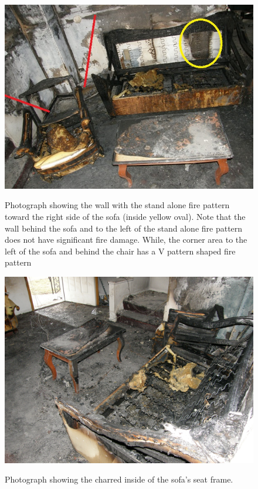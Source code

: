 \documentclass[twoside]{uocthesis}
\begin{document}
{\begin{figure}[h]
	\includegraphics[width=5in]{../Figures/Pre_Flashover_Markup} \\
	\caption[Photograph showing the wall with the stand alone fire pattern toward the right side of the sofa.]{Photograph showing the wall with the stand alone fire pattern toward the right side of the sofa (inside yellow oval). Note that the wall behind the sofa and to the left of the stand alone fire pattern does not have significant fire damage. While, the corner area to the left of the sofa and behind the chair has a V pattern shaped fire pattern}
	\label{Pre_Flashover_Markup}
\end{figure}

\begin{figure}[h]
	\includegraphics[width=5in]{../Figures/Table} \\
	\caption[Photograph showing the charred inside of the sofa's seat frame.]{Photograph showing the charred inside of the sofa's seat frame.}
	\label{Table}
\end{figure}

}
\end{document}
